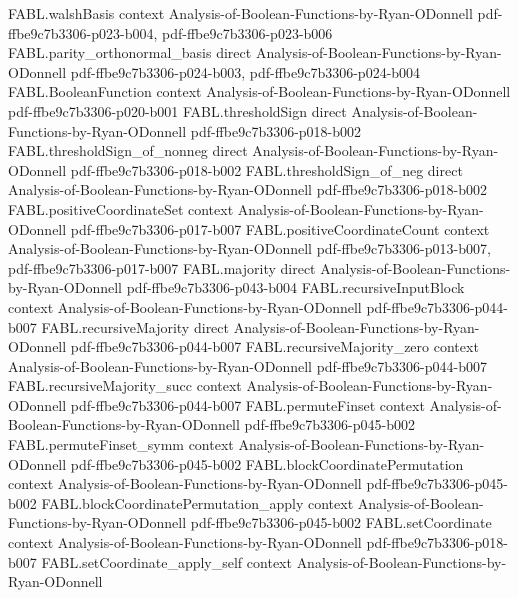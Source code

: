 \begin{theorem}
\proofstep
  {FABL.walshBasis}
  {context}
  {Analysis-of-Boolean-Functions-by-Ryan-ODonnell}
  {pdf-ffbe9c7b3306-p023-b004,
    pdf-ffbe9c7b3306-p023-b006}
\proofstep
  {FABL.parity_orthonormal_basis}
  {direct}
  {Analysis-of-Boolean-Functions-by-Ryan-ODonnell}
  {pdf-ffbe9c7b3306-p024-b003,
    pdf-ffbe9c7b3306-p024-b004}
\proofstep
  {FABL.BooleanFunction}
  {context}
  {Analysis-of-Boolean-Functions-by-Ryan-ODonnell}
  {pdf-ffbe9c7b3306-p020-b001}
\proofstep
  {FABL.thresholdSign}
  {direct}
  {Analysis-of-Boolean-Functions-by-Ryan-ODonnell}
  {pdf-ffbe9c7b3306-p018-b002}
\proofstep
  {FABL.thresholdSign_of_nonneg}
  {direct}
  {Analysis-of-Boolean-Functions-by-Ryan-ODonnell}
  {pdf-ffbe9c7b3306-p018-b002}
\proofstep
  {FABL.thresholdSign_of_neg}
  {direct}
  {Analysis-of-Boolean-Functions-by-Ryan-ODonnell}
  {pdf-ffbe9c7b3306-p018-b002}
\proofstep
  {FABL.positiveCoordinateSet}
  {context}
  {Analysis-of-Boolean-Functions-by-Ryan-ODonnell}
  {pdf-ffbe9c7b3306-p017-b007}
\proofstep
  {FABL.positiveCoordinateCount}
  {context}
  {Analysis-of-Boolean-Functions-by-Ryan-ODonnell}
  {pdf-ffbe9c7b3306-p013-b007,
    pdf-ffbe9c7b3306-p017-b007}
\proofstep
  {FABL.majority}
  {direct}
  {Analysis-of-Boolean-Functions-by-Ryan-ODonnell}
  {pdf-ffbe9c7b3306-p043-b004}
\proofstep
  {FABL.recursiveInputBlock}
  {context}
  {Analysis-of-Boolean-Functions-by-Ryan-ODonnell}
  {pdf-ffbe9c7b3306-p044-b007}
\proofstep
  {FABL.recursiveMajority}
  {direct}
  {Analysis-of-Boolean-Functions-by-Ryan-ODonnell}
  {pdf-ffbe9c7b3306-p044-b007}
\proofstep
  {FABL.recursiveMajority_zero}
  {context}
  {Analysis-of-Boolean-Functions-by-Ryan-ODonnell}
  {pdf-ffbe9c7b3306-p044-b007}
\proofstep
  {FABL.recursiveMajority_succ}
  {context}
  {Analysis-of-Boolean-Functions-by-Ryan-ODonnell}
  {pdf-ffbe9c7b3306-p044-b007}
\proofstep
  {FABL.permuteFinset}
  {context}
  {Analysis-of-Boolean-Functions-by-Ryan-ODonnell}
  {pdf-ffbe9c7b3306-p045-b002}
\proofstep
  {FABL.permuteFinset_symm}
  {context}
  {Analysis-of-Boolean-Functions-by-Ryan-ODonnell}
  {pdf-ffbe9c7b3306-p045-b002}
\proofstep
  {FABL.blockCoordinatePermutation}
  {context}
  {Analysis-of-Boolean-Functions-by-Ryan-ODonnell}
  {pdf-ffbe9c7b3306-p045-b002}
\proofstep
  {FABL.blockCoordinatePermutation_apply}
  {context}
  {Analysis-of-Boolean-Functions-by-Ryan-ODonnell}
  {pdf-ffbe9c7b3306-p045-b002}
\proofstep
  {FABL.setCoordinate}
  {context}
  {Analysis-of-Boolean-Functions-by-Ryan-ODonnell}
  {pdf-ffbe9c7b3306-p018-b007}
\proofstep
  {FABL.setCoordinate_apply_self}
  {context}
  {Analysis-of-Boolean-Functions-by-Ryan-ODonnell}

\end{theorem}
